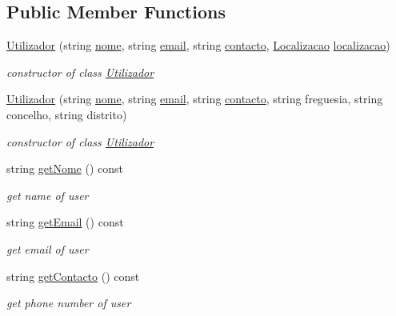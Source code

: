 \subsection*{Public Member Functions}
\begin{DoxyCompactItemize}
\item 
\hyperlink{class_utilizador_a95a298d18d13d9f76c0b6773f4690653}{Utilizador} (string \hyperlink{class_utilizador_a3d22333263aef7b7a61a96b46ba7828d}{nome}, string \hyperlink{class_utilizador_acbfe7f9a279131a567de9c85f00df332}{email}, string \hyperlink{class_utilizador_a15e6d87267bff22599a28ac069d6a210}{contacto}, \hyperlink{class_localizacao}{Localizacao} \hyperlink{class_utilizador_a0bd3436ff45c7f80236d591f750c5522}{localizacao})
\begin{DoxyCompactList}\small\item\em constructor of class \hyperlink{class_utilizador}{Utilizador} \end{DoxyCompactList}\item 
\hyperlink{class_utilizador_add322ece24e90359497d2cf97688cc68}{Utilizador} (string \hyperlink{class_utilizador_a3d22333263aef7b7a61a96b46ba7828d}{nome}, string \hyperlink{class_utilizador_acbfe7f9a279131a567de9c85f00df332}{email}, string \hyperlink{class_utilizador_a15e6d87267bff22599a28ac069d6a210}{contacto}, string freguesia, string concelho, string distrito)
\begin{DoxyCompactList}\small\item\em constructor of class \hyperlink{class_utilizador}{Utilizador} \end{DoxyCompactList}\item 
string \hyperlink{class_utilizador_aa5af9c1385b0a93116dd8a80264b887a}{get\+Nome} () const 
\begin{DoxyCompactList}\small\item\em get name of user \end{DoxyCompactList}\item 
string \hyperlink{class_utilizador_a9fc99ac7634ff085ca0f3afd4d502cc7}{get\+Email} () const 
\begin{DoxyCompactList}\small\item\em get email of user \end{DoxyCompactList}\item 
string \hyperlink{class_utilizador_a1b4563c81eec56c688d75e6e1b3a2dbb}{get\+Contacto} () const 
\begin{DoxyCompactList}\small\item\em get phone number of user \end{DoxyCompactList}\item 

\end{DoxyCompactItemize}
